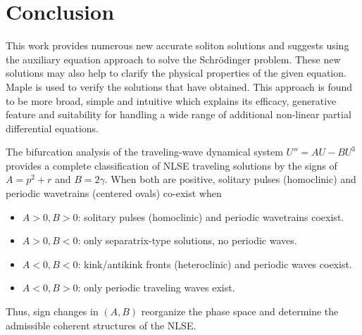 \documentclass[10pt]{NSP1}
\numberwithin{equation}{section}
\begin{document}
\section{Conclusion}\label{s5}

This work provides numerous new accurate soliton solutions and suggests using the auxiliary equation approach to solve the Schr\"odinger problem. These new solutions may also help to clarify the physical properties of the given equation. Maple is used to verify the solutions that have obtained. This approach is found to be more broad, simple and intuitive which explains its efficacy, generative feature and suitability for handling a wide range of additional non-linear partial differential equations.

The bifurcation analysis of the traveling-wave dynamical system $U'' = AU - BU^3$ provides a complete classification of NLSE traveling solutions by the signs of $A = p^2+r$ and $B=2\gamma$. When both are positive, solitary pulses (homoclinic) and periodic wavetrains (centered ovals) co-exist when
\begin{itemize}
    \item $A>0, B>0$: solitary pulses (homoclinic) and periodic wavetrains coexist.
    \item $A>0, B<0$: only separatrix-type solutions, no periodic waves.
    \item $A<0, B<0$: kink/antikink fronts (heteroclinic) and periodic waves coexist.
    \item $A<0, B>0$: only periodic traveling waves exist.
\end{itemize}
Thus, sign changes in $(A,B)$ reorganize the phase space and determine the admissible coherent structures of the NLSE.
\end{document}
